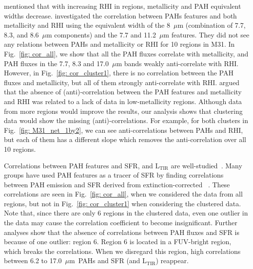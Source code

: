         \cite{Calzetti10} mentioned that with increasing RHI in regions, metallicity and PAH equivalent widths decrease. 
        \cite{Dim15} investigated the correlation between PAHs features and both metallicity and RHI using the equivalent width of the 8~$\mu$m (combination of 7.7, 8.3, and 8.6~$\mu$m components) and the 7.7 and 11.2~$\mu$m features.
        They did not see any relations between PAHs and metallicity or RHI for 10 regions in M31.
        In Fig.~\ref{fig: cor_all}, we show that all the PAH fluxes correlate with metallicity, and PAH fluxes in the 7.7, 8.3 and 17.0~$\mu$m bands weakly anti-correlate with RHI.
        However, in Fig.~\ref{fig: cor_cluster1}, there is no correlation between the PAH fluxes and metallicity, but all of them strongly anti-correlate with RHI.
        \cite{Dim15} argued that the absence of (anti)-correlation between the PAH features and metallicity and RHI was related to a lack of data in low-metallicity regions.
        Although data from more regions would improve the results, our analysis shows that clustering data would show the missing (anti)-correlations.
        For example, for both clusters in Fig.~\ref{fig: M31_net_1by2},
        we can see anti-correlations between PAHs and RHI, but each of them has a different slope which removes the anti-correlation over all 10 regions. 
        
        Correlations between PAH features and SFR, and L$_\mathrm{TIR}$ are well-studied~\citep[e.g.][]{Peeters04,Tielens08}. 
        Many groups have used PAH features as a tracer of SFR by finding correlations between 
        PAH emission and SFR derived from extinction-corrected \halpha~\citep[e.g.][]{Calzetti07,Khramtsova13,Shipley16}.
        These correlations are seen in Fig.~\ref{fig: cor_all}, when we considered the data from all regions, but not in Fig.~\ref{fig: cor_cluster1} when considering the clustered data.
        Note that, since there are only 6 regions in the clustered data, even one outlier in the data may cause the correlation coefficient to become insignificant.
        Further analyses show that the absence of correlations between PAH fluxes and SFR is because of one outlier: region 6. Region 6 is located in a FUV-bright region, which breaks the correlations. 
        When we disregard this region, high correlations between 6.2 to 17.0~$\mu$m~PAHs and SFR (and L$_\mathrm{TIR}$) reappear.
        
